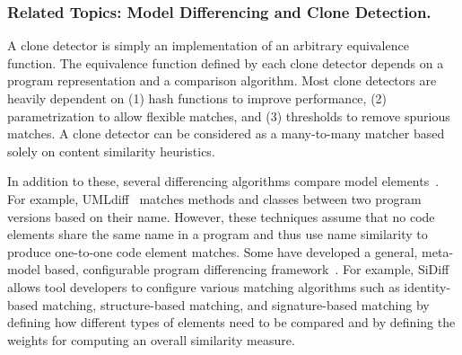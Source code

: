 \subsubsection{Related Topics: Model Differencing and Clone Detection.} 

A clone detector is simply an implementation of an arbitrary equivalence function. The equivalence function defined by each clone detector depends on a program representation and a comparison algorithm. Most clone detectors are heavily dependent on (1) hash functions to improve performance, (2) parametrization to allow flexible matches, and (3) thresholds to remove spurious matches. A clone detector can be considered as a many-to-many matcher based solely on content similarity heuristics. 

In addition to these, several differencing algorithms compare model elements~\cite{UMLDiff2005, Ohst2003:umldiff, Soto2006:deltaprocess, Duley2012:vdiff}. For example, UMLdiff~\cite{UMLDiff2005} matches methods and classes between two program versions based on their name. However, these techniques assume that no code elements share the same name in a program and thus use name similarity to produce one-to-one code element matches. Some have developed a general, meta-model based, configurable program differencing framework~\cite{Schmidt2008:sidiff, EMF}. For example, SiDiff \cite{Schmidt2008:sidiff,Treude2007} allows tool developers to configure various matching algorithms such as identity-based matching, structure-based matching, and signature-based matching by defining how different types of elements need to be compared and by defining the weights for computing an overall similarity measure.


